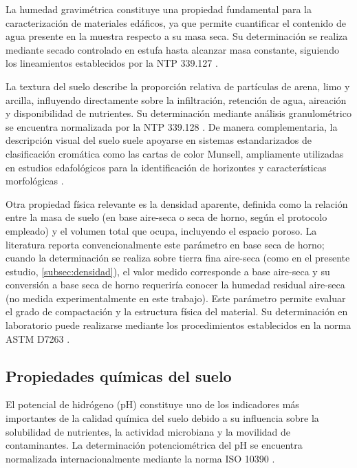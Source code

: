 \documentclass[fleqn]{jaes}
\begin{document}
La humedad gravimétrica constituye una propiedad fundamental para la caracterización de materiales edáficos, ya que permite cuantificar el contenido de agua presente en la muestra respecto a su masa seca. Su determinación se realiza mediante secado controlado en estufa hasta alcanzar masa constante, siguiendo los lineamientos establecidos por la NTP 339.127 \cite{INACAL2019}.

La textura del suelo describe la proporción relativa de partículas de arena, limo y arcilla, influyendo directamente sobre la infiltración, retención de agua, aireación y disponibilidad de nutrientes. Su determinación mediante análisis granulométrico se encuentra normalizada por la NTP 339.128 \cite{INACAL1999}. De manera complementaria, la descripción visual del suelo suele apoyarse en sistemas estandarizados de clasificación cromática como las cartas de color Munsell, ampliamente utilizadas en estudios edafológicos para la identificación de horizontes y características morfológicas \cite{MunsellColorServices2009}.

Otra propiedad física relevante es la densidad aparente, definida como la relación entre la masa de suelo (en base aire-seca o seca de horno, según el protocolo empleado) y el volumen total que ocupa, incluyendo el espacio poroso. La literatura reporta convencionalmente este parámetro en base seca de horno; cuando la determinación se realiza sobre tierra fina aire-seca (como en el presente estudio, \cref{subsec:densidad}), el valor medido corresponde a base aire-seca y su conversión a base seca de horno requeriría conocer la humedad residual aire-seca (no medida experimentalmente en este trabajo). Este parámetro permite evaluar el grado de compactación y la estructura física del material. Su determinación en laboratorio puede realizarse mediante los procedimientos establecidos en la norma ASTM D7263 \cite{ASTMInternational2009}.

\subsection{Propiedades químicas del suelo}

El potencial de hidrógeno (pH) constituye uno de los indicadores más importantes de la calidad química del suelo debido a su influencia sobre la solubilidad de nutrientes, la actividad microbiana y la movilidad de contaminantes. La determinación potenciométrica del pH se encuentra normalizada internacionalmente mediante la norma ISO 10390 \cite{InternationalOrganizationforStandardization2021}.
\end{document}
